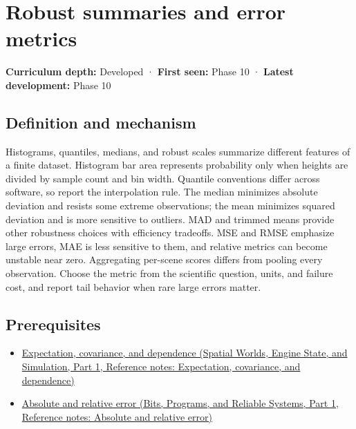 \hypertarget{appendix-bcc44e9d3d02}{}\label{referencestart:appendix-bcc44e9d3d02}
\section{Robust summaries and error metrics}\label{appendix-bcc44e9d3d02-robust-summaries-and-error-metrics}

\hypertarget{appendix-bcc44e9d3d02-robust-summaries-and-error-metrics}{}

\textbf{Curriculum depth:} Developed · \textbf{First seen:} Phase 10 · \textbf{Latest development:} Phase 10

\begin{allmightroledefinition}

\subsection{Definition and mechanism}\label{appendix-bcc44e9d3d02-definition-and-mechanism}

\hypertarget{appendix-bcc44e9d3d02-definition-and-mechanism}{}

Histograms, quantiles, medians, and robust scales summarize different features of a finite dataset. Histogram bar area represents probability only when heights are divided by sample count and bin width. Quantile conventions differ across software, so report the interpolation rule. The median minimizes absolute deviation and resists some extreme observations; the mean minimizes squared deviation and is more sensitive to outliers. MAD and trimmed means provide other robustness choices with efficiency tradeoffs. MSE and RMSE emphasize large errors, MAE is less sensitive to them, and relative metrics can become unstable near zero. Aggregating per-scene scores differs from pooling every observation. Choose the metric from the scientific question, units, and failure cost, and report tail behavior when rare large errors matter.

\end{allmightroledefinition}

\subsection{Prerequisites}\label{appendix-bcc44e9d3d02-prerequisites}

\hypertarget{appendix-bcc44e9d3d02-prerequisites}{}

\begin{itemize}
\tightlist
\item
  \href{../05-Spatial-Worlds-Engine-State-and-Simulation-P01/main.pdf\#nameddest=appendix-54c383df9992}{Expectation, covariance, and dependence (Spatial Worlds, Engine State, and Simulation, Part 1, Reference notes: Expectation, covariance, and dependence)}
\item
  \href{../01-Bits-Programs-and-Reliable-Systems-P01/main.pdf\#nameddest=appendix-3ae74e89b4e6}{Absolute and relative error (Bits, Programs, and Reliable Systems, Part 1, Reference notes: Absolute and relative error)}
\end{itemize}

